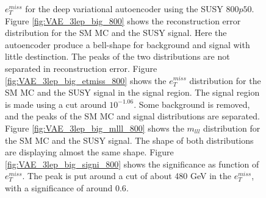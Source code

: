 \begin{figure}[H]
{    $e_T^{miss}$ for the deep variational autoencoder using the SUSY $800p50$.
    Figure \ref{fig:VAE_3lep_big_800} shows the reconstruction error 
    distribution for the SM MC and the SUSY signal. Here the autoencoder produce a bell-shape for background and 
    signal with little destinction. The peaks of the two distributions are not separated in reconstruction error. Figure \ref{fig:VAE_3lep_big_etmiss_800} 
    shows the $e_T^{miss}$ distribution for the SM MC and the SUSY signal in the signal region. 
    The signal region is made using a cut around $10^{-1.06}$. Some background is removed, and the peaks of the SM MC and signal 
    distributions are separated. Figure \ref{fig:VAE_3lep_big_mlll_800} shows the $m_{lll}$ distribution for the SM MC and the SUSY signal. 
    The shape of both distributions are displaying almost the same shape. Figure \ref{fig:VAE_3lep_big_signi_800} shows the significance as 
    function of $e_T^{miss}$. The peak is put around a cut of about 480 GeV in the $e_T^{miss}$, with a significance of around $0.6$.}
    \label{fig:VAE_3lep_big_rec_sig_signi_800}
\end{figure}

